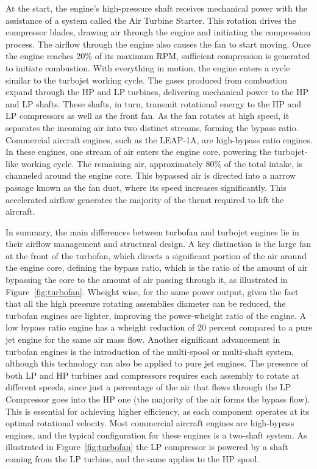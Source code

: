 At the start, the engine's high-pressure shaft receives mechanical power with the assistance of a system called the Air Turbine Starter. This rotation drives the compressor blades, drawing air through the engine and initiating the compression process. The airflow through the engine also causes the fan to start moving. Once the engine reaches 20\% of its maximum RPM, sufficient compression is generated to initiate combustion. With everything in motion, the engine enters a cycle similar to the turbojet working cycle. The gases produced from combustion expand through the \gls{HP} and \gls{LP} turbines, delivering mechanical power to the \gls{HP} and \gls{LP} shafts. These shafts, in turn, transmit rotational energy to the \gls{HP} and \gls{LP} compressors as well as the front fan.
As the fan rotates at high speed, it separates the incoming air into two distinct streams, forming the bypass ratio. Commercial aircraft engines, such as the LEAP-1A, are high-bypass ratio engines. In these engines, one stream of air enters the engine core, powering the turbojet-like working cycle. The remaining air, approximately 80\% of the total intake, is channeled around the engine core. This bypassed air is directed into a narrow passage known as the fan duct, where its speed increases significantly. This accelerated airflow generates the majority of the thrust required to lift the aircraft.  

In summary, the main differences between turbofan and turbojet engines lie in their airflow management and structural design. A key distinction is the large fan at the front of the turbofan, which directs a significant portion of the air around the engine core, defining the bypass ratio, which is the ratio of the amount of air bypassing the core to the amount of air passing through it, as illustrated in Figure~\ref{fig:turbofan}.
Wheight wise, for the same power output, given the fact that all the high pressure rotating assemblies diameter can be reduced, the turbofan engines are lighter, improving the power-wheight ratio of the engine. A low bypass ratio engine has a wheight reduction of 20 percent compared to a pure jet engine for the same air mass flow.\cite{RollsRoyce}
Another significant advancement in turbofan engines is the introduction of the multi-spool or multi-shaft system, although this technology can also be applied to pure jet engines. The presence of both \gls{LP} and \gls{HP} turbines and compressors requires each assembly to rotate at different speeds, since just a percentage of the air that flows through the \gls{LP} Compressor goes into the \gls{HP} one (the majority of the air forms the bypass flow). This is essential for achieving higher efficiency, as each component operates at its optimal rotational velocity. 
Most commercial aircraft engines are high-bypass engines, and the typical configuration for these engines is a two-shaft system. As illustrated in Figure~\ref{fig:turbofan} the \gls{LP} compressor is powered by a shaft coming from the \gls{LP} turbine, and the same applies to the \gls{HP} spool.

